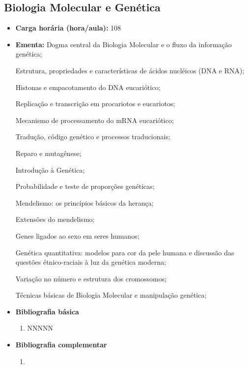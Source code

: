 \documentclass[11pt,fleqn]{book} %
\begin{document}
\subsection{Biologia Molecular e Genética}\label{disc:biomol}
\begin{itemize}
	\item \textbf{Carga horária (hora/aula):} 108
	\item \textbf{Ementa:}
	Dogma central da Biologia Molecular e o fluxo da informação genética;
	
	Estrutura, propriedades e características de ácidos nucléicos (DNA e RNA);

	Histonas e empacotamento do DNA eucariótico; 	
	
	Replicação e transcrição em procariotos e eucariotos;
	
	Mecanismo de processamento do mRNA eucariótico; 
	
	Tradução, código genético e processos traducionais; 
	
	
	Reparo e mutagênese;
	
	Introdução à Genética;

	Probabilidade e teste de proporções genéticas; 

	Mendelismo: os princípios básicos da herança; 

	Extensões do mendelismo; 

	Genes ligados ao sexo em seres humanos;

	Genética quantitativa: modelos para cor da pele humana e discussão das questões étnico-raciais à luz da genética moderna;

	Variação no número e estrutura dos cromossomos;

	Técnicas básicas de Biologia Molecular e manipulação genética;
	
	\item \textbf{Bibliografia básica}
	\begin{enumerate}
		\item NNNNN
	\end{enumerate}
	\item \textbf{Bibliografia complementar}
	\begin{enumerate}
		\item 
	\end{enumerate}	
\end{itemize}

\newpage
\end{document}
